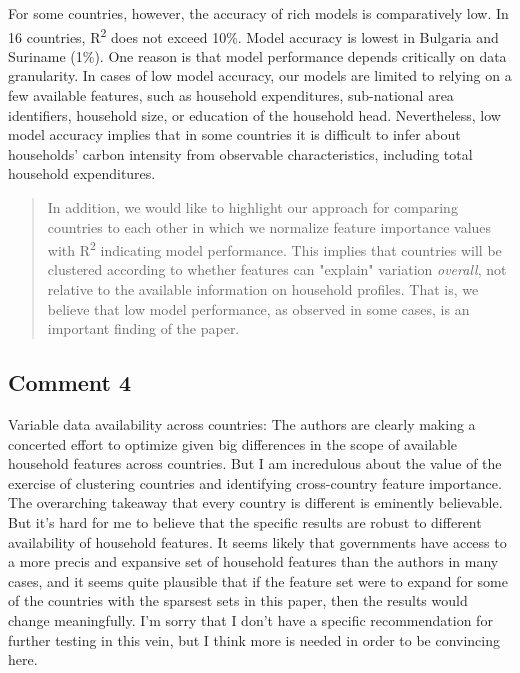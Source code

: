 \documentclass[11pt]{article}
\newenvironment{response}
{\begin{quote}\color{black}}
{\end{quote}}
\begin{document}
\begin{revisionbox}
    For some countries, however, the accuracy of rich models is comparatively low. In 16 countries, R\textsuperscript{2} does not exceed 10\%. Model accuracy is lowest in Bulgaria and Suriname (1\%). One reason is that model performance depends critically on data granularity. In cases of low model accuracy, our models are limited to relying on a few available features, such as household expenditures, sub-national area identifiers, household size, or education of the household head. Nevertheless, low model accuracy implies that in some countries it is difficult to infer about households' carbon intensity from observable characteristics, including total household expenditures.
\end{revisionbox}

\begin{response}
    In addition, we would like to highlight our approach for comparing countries to each other in which we normalize feature importance values with R\textsuperscript{2} indicating model performance. This implies that countries will be clustered according to whether features can "explain" variation \textit{overall}, not relative to the available information on household profiles. That is, we believe that low model performance, as observed in some cases, is an important finding of the paper.
\end{response}

\subsection*{Comment 4}\label{comment_R1_4}

\begin{commentbox}
    Variable data availability across countries: The authors are clearly making a concerted effort to optimize given big differences in the scope of available household features across countries. But I am incredulous about the value of the exercise of clustering countries and identifying cross-country feature importance. The overarching takeaway that every country is different is eminently believable. But it's hard for me to believe that the specific results are robust to different availability of household features. It seems likely that governments have access to a more precis and expansive set of household features than the authors in many cases, and it seems quite plausible that if the feature set were to expand for some of the countries with the sparsest sets in this paper, then the results would change meaningfully. I'm sorry that I don't have a specific recommendation for further testing in this vein, but I think more is needed in order to be convincing here.
\end{commentbox}
\end{document}
